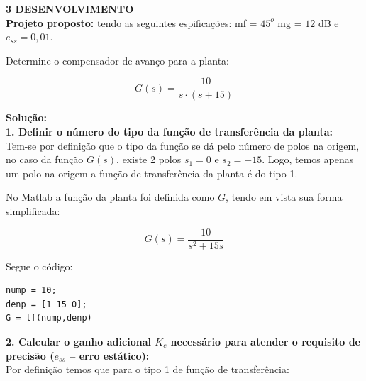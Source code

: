 \noindent \textcolor{myBlue}{\textbf{\large{3 DESENVOLVIMENTO }}}\\

\noindent \textbf{Projeto proposto:} tendo as seguintes espificações: mf = $45^o$ mg = $12$ dB e $e_{ss} = 0,01$. 

\begin{figure}[H]
\centering
{}
\end{figure}

\noindent Determine o compensador de avanço para a planta:

\[ G(s) = \dfrac{10}{s\cdot (s+15)}\]

\noindent \textbf{Solução:} \\

\noindent \textbf{1. Definir o número do tipo da função de transferência da planta:} \\

Tem-se por definição que o tipo da função se dá pelo número de polos na origem, no caso da função $G(s)$, existe 2 polos $s_1 = 0$ e $s_2 = -15$. Logo, temos apenas um polo na origem {\color{red}a função de transferência da planta é do tipo 1}.

No Matlab a função da planta foi definida como $G$, tendo em vista sua forma simplificada:

\[G(s) = \dfrac{10}{s^2 + 15s}\]

\noindent Segue o código: 

\begin{lstlisting}[style=matlab]
nump = 10;
denp = [1 15 0];
G = tf(nump,denp)
\end{lstlisting}\vspace{0.2cm}



\noindent \textbf{2. Calcular o ganho adicional $K_c$ necessário para atender o requisito de precisão ($e_{ss}$ – erro estático):} \\

Por definição temos que para o tipo 1 de função de transferência:

